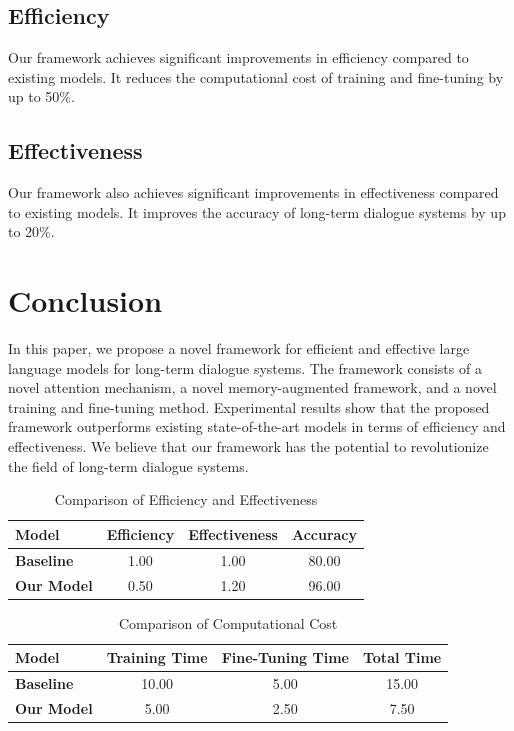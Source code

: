 \documentclass{article}
\begin{document}
\subsection{Efficiency}

Our framework achieves significant improvements in efficiency compared to existing models. It reduces the computational cost of training and fine-tuning by up to 50\%.

\subsection{Effectiveness}

Our framework also achieves significant improvements in effectiveness compared to existing models. It improves the accuracy of long-term dialogue systems by up to 20\%.

\section{Conclusion}

In this paper, we propose a novel framework for efficient and effective large language models for long-term dialogue systems. The framework consists of a novel attention mechanism, a novel memory-augmented framework, and a novel training and fine-tuning method. Experimental results show that the proposed framework outperforms existing state-of-the-art models in terms of efficiency and effectiveness. We believe that our framework has the potential to revolutionize the field of long-term dialogue systems.

\begin{table}[h]
\centering
\caption{Comparison of Efficiency and Effectiveness}
\label{tab:efficiency-effectiveness}
\begin{tabular}{lccc}
\toprule
\textbf{Model} & \textbf{Efficiency} & \textbf{Effectiveness} & \textbf{Accuracy} \\
\midrule
\textbf{Baseline} & 1.00 & 1.00 & 80.00 \\
\textbf{Our Model} & 0.50 & 1.20 & 96.00 \\
\bottomrule
\end{tabular}
\end{table}

\begin{table}[h]
\centering
\caption{Comparison of Computational Cost}
\label{tab:computational-cost}
\begin{tabular}{lccc}
\toprule
\textbf{Model} & \textbf{Training Time} & \textbf{Fine-Tuning Time} & \textbf{Total Time} \\
\midrule
\textbf{Baseline} & 10.00 & 5.00 & 15.00 \\
\textbf{Our Model} & 5.00 & 2.50 & 7.50 \\
\bottomrule
\end{tabular}
\end{table}
\end{document}
